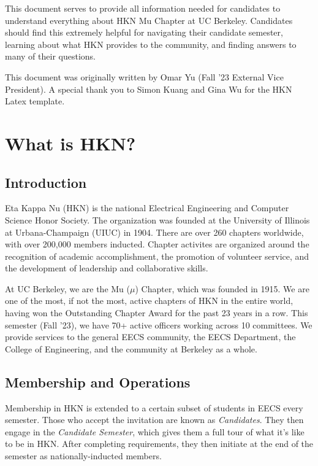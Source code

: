 \documentclass[11pt, article, oneside]{memoir}
\begin{document}
	\maketitle
	
	This document serves to provide all information needed for candidates to understand everything about HKN Mu Chapter at UC Berkeley. Candidates should find this extremely helpful for navigating their candidate semester, learning about what HKN provides to the community, and finding answers to many of their questions.
    \bigbreak

    This document was originally written by Omar Yu (Fall '23 External Vice President). A special thank you to Simon Kuang and Gina Wu for the HKN Latex template.
	
	\tableofcontents*
	\newpage

    
	\chapter{What is HKN?}
    \section{Introduction}
        Eta Kappa Nu (HKN) is the national Electrical Engineering and Computer Science Honor Society. The organization was founded at the University of Illinois at Urbana-Champaign (UIUC) in 1904. There are over 260 chapters worldwide, with over 200,000 members inducted. Chapter activites are organized around the recognition of academic accomplishment, the promotion of volunteer service, and the development of leadership and collaborative skills. 
        
        \bigbreak
        At UC Berkeley, we are the Mu ($\mu$) Chapter, which was founded in 1915. We are one of the most, if not the most, active chapters of HKN in the entire world, having won the Outstanding Chapter Award for the past 23 years in a row. This semester (Fall '23), we have 70+ active officers working across 10 committees. We provide services to the general EECS community, the EECS Department, the College of Engineering, and the  community at Berkeley as a whole.
        
    \section{Membership and Operations}
        Membership in HKN is extended to a certain subset of students in EECS every semester. Those who accept the invitation are known as \emph{Candidates}. They then engage in the \emph{Candidate Semester}, which gives them a full tour of what it's like to be in HKN. After completing requirements, they then initiate at the end of the semester as nationally-inducted members.
\end{document}

